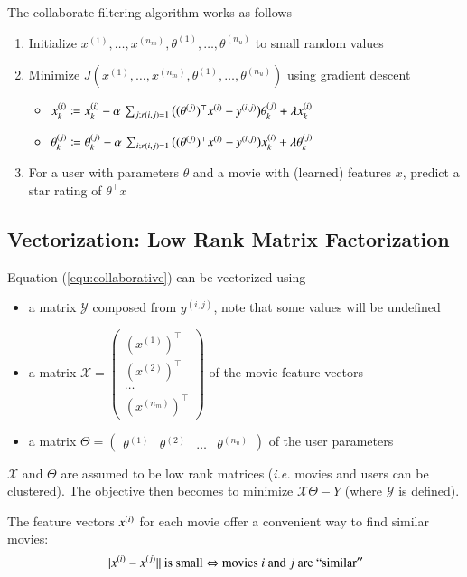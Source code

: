 \documentclass[a4paper,twoside,10pt]{article}
\begin{document}
The collaborate filtering algorithm works as follows
\begin{enumerate}
  \item Initialize $x^{(1)},\ldots,x^{(n_m)},\theta^{(1)},\ldots,\theta^{(n_u)}$ to small random values
  \item Minimize $J(x^{(1)},\ldots,x^{(n_m)},\theta^{(1)},\ldots,\theta^{(n_u)})$ using gradient descent
    \begin{itemize}
      \item $x^{(i)}_k\coloneqq x^{(i)}_k-\alpha\,\sum_{j;r(i,j)=1}\big((\theta^{(j)})^\top x^{(i)}-y^{(i,j)}\big)\theta^{(j)}_k+\lambda x^{(i)}_k$
      \item $\theta_k^{(j)}\coloneqq\theta_k^{(j)}-\alpha\,\sum_{i;r(i,j)=1}\big((\theta^{(j)})^\top x^{(i)}-y^{(i,j)}\big)x^{(i)}_k+\lambda\theta^{(j)}_k$
    \end{itemize}
  \item For a user with parameters $\theta$ and a movie with (learned) features $x$, predict a star rating of $\theta^\top x$
\end{enumerate}

\subsection{Vectorization: Low Rank Matrix Factorization}
Equation (\ref{equ:collaborative}) can be vectorized using
\begin{itemize}
  \item a matrix $\mathcal{Y}$ composed from $y^{(i,j)}$, note that some values will be undefined
  \item a matrix $\mathcal{X}=\begin{pmatrix}(x^{(1)})^\top\\(x^{(2)})^\top\\\hdots\\(x^{(n_m)})^\top\end{pmatrix}$ of the movie feature vectors
  \item a matrix $\Theta=\begin{pmatrix}\theta^{(1)}&\theta^{(2)}&\hdots&\theta^{(n_u)}\end{pmatrix}$ of the user parameters
\end{itemize}
$\mathcal{X}$ and $\Theta$ are assumed to be low rank matrices (\emph{i.e.} movies and users can be clustered).
The objective then becomes to minimize $\mathcal{X}\Theta-Y$ (where $\mathcal{Y}$ is defined).

The feature vectors $x^{(i)}$ for each movie offer a convenient way to find similar movies:
\begin{equation*}
  ||x^{(i)}-x^{(j)}||\mathrm{\ is\ small}\Leftrightarrow\mathrm{movies\ }i\mathrm{\ and\ }j\mathrm{\ are\ ``similar''}
\end{equation*}
\end{document}
